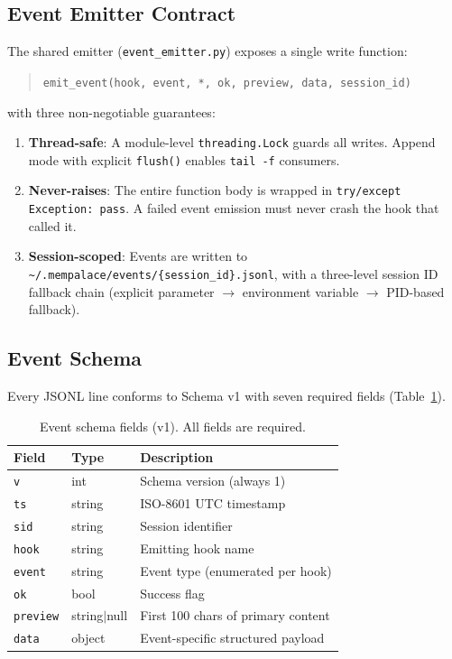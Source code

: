 \documentclass[11pt]{article}
\begin{document}
\subsection{Event Emitter Contract}

The shared emitter (\texttt{event\_emitter.py}) exposes a single write
function:

\begin{quote}
\texttt{emit\_event(hook, event, *, ok, preview, data, session\_id)}
\end{quote}

\noindent with three non-negotiable guarantees:

\begin{enumerate}[nosep]
    \item \textbf{Thread-safe}: A module-level \texttt{threading.Lock}
          guards all writes. Append mode with explicit \texttt{flush()}
          enables \texttt{tail -f} consumers.
    \item \textbf{Never-raises}: The entire function body is wrapped in
          \texttt{try/except Exception: pass}. A failed event emission
          must never crash the hook that called it.
    \item \textbf{Session-scoped}: Events are written to
          \texttt{\textasciitilde/.mempalace/events/\{session\_id\}.jsonl},
          with a three-level session ID fallback chain (explicit
          parameter $\to$ environment variable $\to$ PID-based
          fallback).
\end{enumerate}

\subsection{Event Schema}

Every JSONL line conforms to Schema v1 with seven required fields
(Table~\ref{tab:event-schema}).

\begin{table}[H]
\centering
\caption{Event schema fields (v1). All fields are required.}
\label{tab:event-schema}
\begin{tabular}{@{}lll@{}}
\toprule
\textbf{Field} & \textbf{Type} & \textbf{Description} \\
\midrule
\texttt{v}       & int    & Schema version (always 1) \\
\texttt{ts}      & string & ISO-8601 UTC timestamp \\
\texttt{sid}     & string & Session identifier \\
\texttt{hook}    & string & Emitting hook name \\
\texttt{event}   & string & Event type (enumerated per hook) \\
\texttt{ok}      & bool   & Success flag \\
\texttt{preview} & string$|$null & First 100 chars of primary content \\
\texttt{data}    & object & Event-specific structured payload \\
\bottomrule
\end{tabular}
\end{table}
\end{document}
